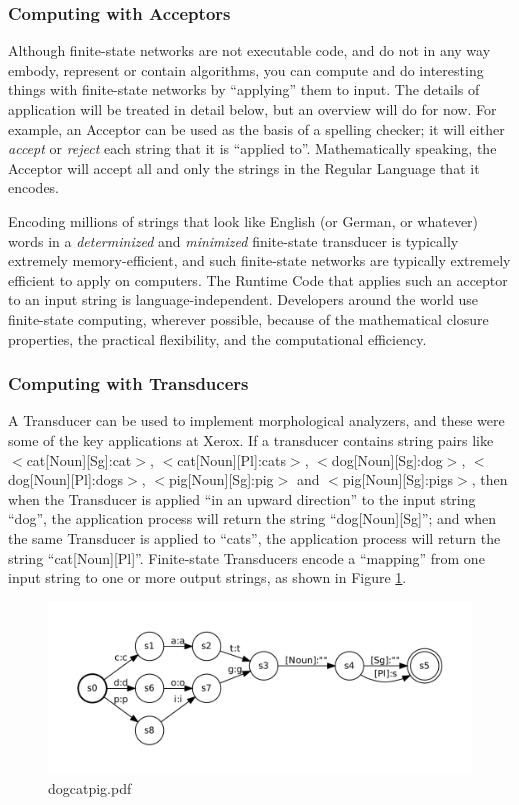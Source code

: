 \documentclass[letterpaper,12pt]{article}
\begin{document}
\subsubsection{Computing with Acceptors}

Although finite-state networks are not executable code, and do not in any way embody, represent or contain
algorithms, you can compute and do interesting things with finite-state networks by ``applying'' them
to input.  The details of application will be treated in detail below, but an overview will do for now.
For example, an Acceptor can be used as the
basis of a spelling checker; it will either \emph{accept} or \emph{reject} each string that it is ``applied to''.
Mathematically speaking, the Acceptor will accept all and only the strings in the Regular Language that
it encodes.  

Encoding millions of strings that look like English (or German, or whatever) words in a \emph{determinized} and \emph{minimized} finite-state
transducer is typically extremely memory-efficient, and such finite-state networks are typically extremely efficient to
apply on computers.  The
Runtime Code that applies such an acceptor to an input string is language-independent.
Developers around the world use finite-state computing, wherever possible, because of the mathematical closure properties, the practical
flexibility, and the computational efficiency.

\subsubsection{Computing with Transducers}

A Transducer can be used to implement morphological analyzers, and these
were some of the key applications at Xerox.  If a transducer contains
string pairs like $<$cat[Noun][Sg]:cat$>$, $<$cat[Noun][Pl]:cats$>$,
$<$dog[Noun][Sg]:dog$>$, $<$dog[Noun][Pl]:dogs$>$,
$<$pig[Noun][Sg]:pig$>$ and $<$pig[Noun][Sg]:pigs$>$, then when the
Transducer is applied ``in an upward direction'' to the input string ``dog'', the application process will return the
string ``dog[Noun][Sg]''; and when the same Transducer is applied to
``cats'', the application process will return the string
``cat[Noun][Pl]''.   Finite-state Transducers encode a ``mapping'' from
one input string to one or more output strings, as shown in Figure
\ref{fig:dogcatpig}.

\begin{figure}
\includegraphics[width=15cm]{images/dogcatpig}
\caption{dogcatpig.pdf}
\label{fig:dogcatpig}
\end{figure}
\end{document}
